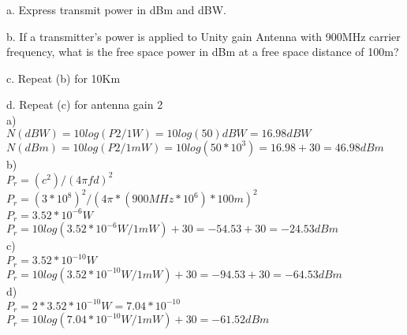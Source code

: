 \documentclass{article}
\begin{document}
a. Express transmit power in dBm and dBW.

b. If a transmitter’s power is applied to Unity gain Antenna with 900MHz carrier frequency, what is the free space power in dBm at a free space distance of 100m?

c. Repeat (b) for 10Km

d. Repeat (c) for antenna gain 2 \\
	a) \\ 
	$N(dBW) = 10log(P2/1W) = 10log(50)dBW = 16.98 dBW$\\
	$N(dBm) = 10log(P2/1mW) = 10log(50*10^3) = 16.98 + 30 = 46.98dBm$ \\
	b) \\
	$P_r = (c^2)/(4πfd)^2$ \\
  $P_r = (3*10^8)^2 / (4π*(900MHz*10^6)*100m)^2$ \\
  $P_r =3.52*10^{-6} W $ \\
  $P_r = 10log(3.52*10^{-6}W/1mW) + 30 = -54.53 + 30 = -24.53 dBm $ \\
	c) \\
	$P_r = 3.52 * 10^{-10} W$ \\
	$P_r = 10log(3.52 * 10^{-10}W/1mW) + 30 = -94.53 + 30 = -64.53dBm$ \\
	d) \\
	$P_r = 2*3.52 * 10^{-10}W = 7.04 * 10^{-10} $ \\
	$P_r = 10log(7.04 * 10^{-10}W/1mW) + 30 = -61.52dBm $ \\
\end{document}
